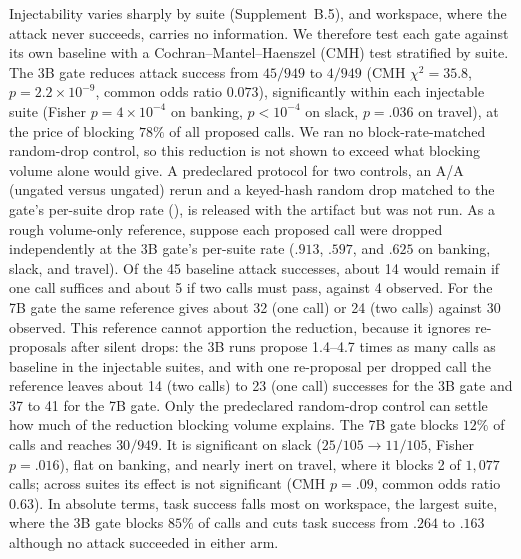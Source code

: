 Injectability varies sharply by suite (Supplement~B.5), and workspace,
where the attack never succeeds, carries no information. We therefore test
each gate against its own baseline with a Cochran--Mantel--Haenszel (CMH) test
stratified by suite. The 3B gate reduces attack success from $45/949$ to
$4/949$ (CMH $\chi^2=35.8$, $p=2.2{\times}10^{-9}$, common odds ratio $0.073$),
significantly within each injectable suite (Fisher $p=4{\times}10^{-4}$ on
banking, $p<10^{-4}$ on slack, $p=.036$ on travel), at the price of blocking
$78\%$ of all proposed calls. We ran no block-rate-matched random-drop control, so this reduction is not shown to
exceed what blocking volume alone would give. A predeclared protocol for two controls, an A/A (ungated versus ungated)
rerun and a keyed-hash random drop matched to the gate's per-suite drop rate (), is
released with the artifact but was not run. As a rough volume-only reference, suppose each proposed call were dropped independently at the 3B
gate's per-suite rate ($.913$, $.597$, and $.625$ on banking, slack, and travel). Of the 45 baseline attack
successes, about 14 would remain if one call suffices and about 5 if two calls must pass, against 4 observed. For the
7B gate the same reference gives about 32 (one call) or 24 (two calls) against 30 observed. This reference cannot
apportion the reduction, because it ignores re-proposals after silent drops: the 3B runs propose 1.4--4.7 times as
many calls as baseline in the injectable suites, and with one re-proposal per dropped call the reference leaves
about 14 (two calls) to 23 (one call) successes for the 3B gate and 37 to 41 for the 7B gate. Only the predeclared
random-drop control can settle how much of the reduction blocking volume explains. The 7B gate blocks
$12\%$ of calls and reaches $30/949$. It is significant on slack ($25/105\to11/105$, Fisher $p=.016$),
flat on banking, and nearly inert on travel, where it blocks 2 of $1{,}077$
calls; across suites its effect is not significant (CMH $p=.09$, common odds
ratio $0.63$). In absolute terms, task success falls most on workspace, the largest
suite, where the 3B gate blocks $85\%$ of calls and cuts task
success from $.264$ to $.163$ although no attack succeeded in either arm.

